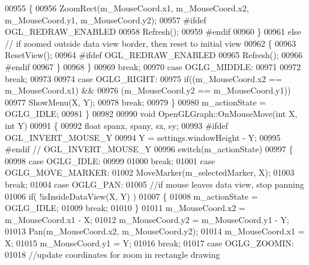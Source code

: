 \begin{DoxyCode}
{{{{{{{{{00955             \{
00956                 ZoomRect(m_MouseCoord.x1, m_MouseCoord.x2, m_MouseCoord.y1, 
      m_MouseCoord.y2);
00957 \textcolor{preprocessor}{                #ifdef OGL\_REDRAW\_ENABLED}
00958                 Refresh();
00959 \textcolor{preprocessor}{                #endif}
00960             \}
00961             \textcolor{keywordflow}{else} \textcolor{comment}{// if zoomed outside data view border, then reset to initial view}
00962             \{
00963                 ResetView();
00964 \textcolor{preprocessor}{                #ifdef OGL\_REDRAW\_ENABLED}
00965                 Refresh();
00966 \textcolor{preprocessor}{                #endif}
00967             \}
00968         \}
00969         \textcolor{keywordflow}{break};
00970     \textcolor{keywordflow}{case} OGLG_MIDDLE:
00971 
00972         \textcolor{keywordflow}{break};
00973 
00974     \textcolor{keywordflow}{case} OGLG_RIGHT:
00975         \textcolor{keywordflow}{if}((m_MouseCoord.x2 == m_MouseCoord.x1) &&
00976         (m_MouseCoord.y2 == m_MouseCoord.y1))
00977             ShowMenu(X, Y);
00978         \textcolor{keywordflow}{break};
00979     \}
00980     m_actionState = OGLG_IDLE;
00981 \}
00982 
00990 \textcolor{keywordtype}{void} OpenGLGraph::OnMouseMove(\textcolor{keywordtype}{int} X, \textcolor{keywordtype}{int} Y)
00991 \{
00992     \textcolor{keywordtype}{float} spanx, spany, sx, sy;
00993 \textcolor{preprocessor}{#ifdef OGL\_INVERT\_MOUSE\_Y}
00994     Y = settings.windowHeight - Y;
00995 \textcolor{preprocessor}{#endif // OGL\_INVERT\_MOUSE\_Y}
00996     \textcolor{keywordflow}{switch}(m_actionState)
00997     \{
00998     \textcolor{keywordflow}{case} OGLG_IDLE:
00999 
01000         \textcolor{keywordflow}{break};
01001     \textcolor{keywordflow}{case} OGLG_MOVE_MARKER:
01002         MoveMarker(m_selectedMarker, X);
01003         \textcolor{keywordflow}{break};
01004     \textcolor{keywordflow}{case} OGLG_PAN:
01005         \textcolor{comment}{//if mouse leaves data view, stop panning}
01006         \textcolor{keywordflow}{if}( !isInsideDataView(X, Y) )
01007         \{
01008             m_actionState = OGLG_IDLE;
01009             \textcolor{keywordflow}{break};
01010         \}
01011         m_MouseCoord.x2 = m_MouseCoord.x1 - X;
01012         m_MouseCoord.y2 = m_MouseCoord.y1 - Y;
01013         Pan(m_MouseCoord.x2, m_MouseCoord.y2);
01014         m_MouseCoord.x1 = X;
01015         m_MouseCoord.y1 = Y;
01016         \textcolor{keywordflow}{break};
01017     \textcolor{keywordflow}{case} OGLG_ZOOMIN:
01018         \textcolor{comment}{//update coordinates for zoom in rectangle drawing}
}}}}}}}}}
\end{DoxyCode}
